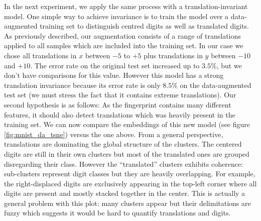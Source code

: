 \documentclass[a4paper,12pt]{report}
\begin{document}
In the next experiment, we apply the same process with a translation-invariant model.
One simple way to achieve invariance is to train the model over a data-augmented training set to distinguish centred digits as well as translated digits.
As previously described, our augmentation consists of a range of translations applied to all samples which are included into the training set.
In our case we chose all translations in $x$ between $-5$ to $+5$ plus translations in $y$ between $-10$ and $+10$.
The error rate on the original test set increased up to $3.5\%$, but we don't have comparisons for this value.
However this model has a strong translation invariance because its error rate is only $8.5\%$ on the data-augmented test set (we must stress the fact that it contains extreme translations).
Our second hypothesis is as follows: As the fingerprint contains many different features, it should also detect translations which was heavily present in the training set.
We can now compare the embeddings of this new model (see figure \ref{fig:mnist_da_tsne}) versus the one above.
From a general perspective, translations are dominating the global structure of the clusters.
The centered digits are still in their own clusters but most of the translated ones are grouped disregarding their class.
However the ``translated'' clusters exhibits coherence: sub-clusters represent digit classes but they are heavily overlapping.
For example, the right-displaced digits are exclusively appearing in the top-left corner where all digits are present and mostly stacked together in the center.
This is actually a general problem with this plot: many clusters appear but their delimitations are fuzzy which suggests it would be hard to quantify translations and digits.
\end{document}
